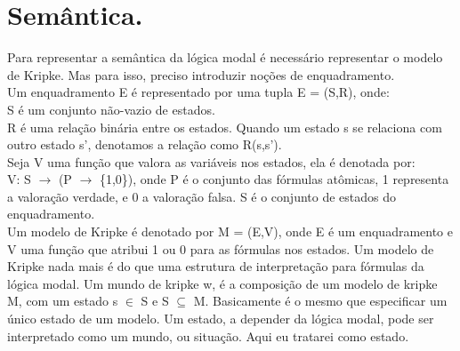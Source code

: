 \documentclass[12pt]{report}
\begin{document}
\section{Semântica.}
 \hspace{0.5cm} Para representar a semântica da lógica modal é necessário representar o modelo de Kripke. Mas para isso, preciso introduzir noções de enquadramento.\\
 \indent Um enquadramento E é representado por uma tupla E = (S,R), onde:\\
 \indent S é um conjunto não-vazio de estados.\\
 \indent R é uma relação binária entre os estados. Quando um estado s se relaciona com outro estado s', denotamos a relação como R(s,s').\\
 \indent Seja V uma função que valora as variáveis nos estados, ela é denotada por:\\
 \indent V: S $\rightarrow $ (P $\rightarrow $  \{1,0\}), onde P é o conjunto das fórmulas atômicas, 1 representa a valoração verdade, e 0 a valoração falsa. S é o conjunto de estados do enquadramento.\\
 \indent Um modelo de Kripke é denotado por M = (E,V), onde E é um enquadramento e V uma função que atribui 1 ou 0 para as fórmulas nos estados. Um modelo de Kripke nada mais é do que uma estrutura de interpretação para fórmulas da lógica modal. Um mundo de kripke w, é a composição de um modelo de kripke M, com um estado s $\in$ S e S $\subseteq$ M. Basicamente é o mesmo que especificar um único estado de um modelo. Um estado, a depender da lógica modal, pode ser interpretado como um mundo, ou situação. Aqui eu tratarei como estado.
\end{document}
